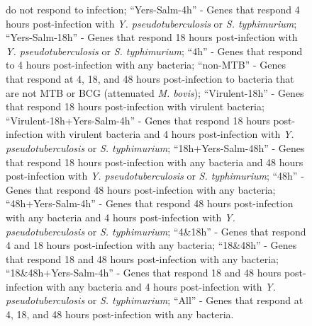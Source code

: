 \begin{figure}[htbp]
{  do not respond to infection; ``Yers-Salm-4h'' - Genes that respond 4
  hours post-infection with \emph{Y. pseudotuberculosis} or
  \emph{S. typhimurium}; ``Yers-Salm-18h'' - Genes that respond 18
  hours post-infection with \emph{Y. pseudotuberculosis} or
  \emph{S. typhimurium}; ``4h'' - Genes that respond to 4 hours
  post-infection with any bacteria; ``non-MTB'' - Genes that respond
  at 4, 18, and 48 hours post-infection to bacteria that are not MTB
  or BCG (attenuated \emph{M. bovis}); ``Virulent-18h'' - Genes that
  respond 18 hours post-infection with virulent bacteria;
  ``Virulent-18h+Yers-Salm-4h'' - Genes that respond 18 hours
  post-infection with virulent bacteria and 4 hours post-infection
  with \emph{Y. pseudotuberculosis} or \emph{S. typhimurium};
  ``18h+Yers-Salm-48h'' - Genes that respond 18 hours post-infection
  with any bacteria and 48 hours post-infection with \emph{Y.
    pseudotuberculosis} or \emph{S. typhimurium}; ``48h'' - Genes that
  respond 48 hours post-infection with any bacteria;
  ``48h+Yers-Salm-4h'' - Genes that respond 48 hours post-infection
  with any bacteria and 4 hours post-infection with \emph{Y.
    pseudotuberculosis} or \emph{S. typhimurium}; ``4\&18h'' - Genes
  that respond 4 and 18 hours post-infection with any bacteria;
  ``18\&48h'' - Genes that respond 18 and 48 hours post-infection with
  any bacteria; ``18\&48h+Yers-Salm-4h'' - Genes that respond 18 and
  48 hours post-infection with any bacteria and 4 hours post-infection
  with \emph{Y. pseudotuberculosis} or \emph{S. typhimurium}; ``All''
  - Genes that respond at 4, 18, and 48 hours post-infection with any
  bacteria.}
\label{fig:joint-all-k14}
\end{figure}

